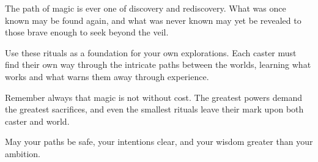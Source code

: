 The path of magic is ever one of discovery and rediscovery. What was once known may be found again, and what was never known may yet be revealed to those brave enough to seek beyond the veil.

Use these rituals as a foundation for your own explorations. Each caster must find their own way through the intricate paths between the worlds, learning what works and what warns them away through experience.

Remember always that magic is not without cost. The greatest powers demand the greatest sacrifices, and even the smallest rituals leave their mark upon both caster and world.

May your paths be safe, your intentions clear, and your wisdom greater than your ambition.
